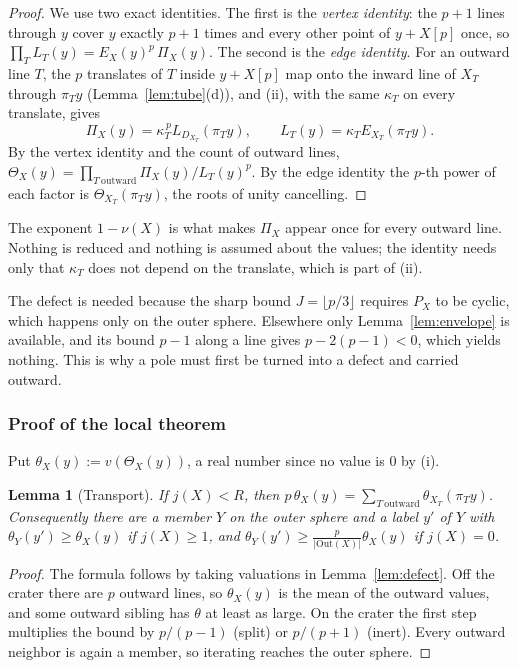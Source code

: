 \documentclass[11pt]{amsart}
\numberwithin{equation}{section}
\theoremstyle{plain}
\newtheorem{lemma}[theorem]{Lemma}
\theoremstyle{definition}
\theoremstyle{remark}
\begin{document}
\begin{proof}
We use two exact identities. The first is the \emph{vertex identity}: the \(p+1\) lines through \(y\) cover \(y\) exactly \(p+1\) times and every other point of \(y+X[p]\) once, so \(\prod_TL_T(y)=E_X(y)^p\,\Pi_X(y)\). The second is the \emph{edge identity}. For an outward line \(T\), the \(p\) translates of \(T\) inside \(y+X[p]\) map onto the inward line of \(X_T\) through \(\pi_Ty\) (Lemma~\ref{lem:tube}(d)), and (ii), with the same \(\kappa_T\) on every translate, gives
\[\Pi_X(y)=\kappa_T^{\,p}L_{D_{X_T}}(\pi_Ty),\qquad L_T(y)=\kappa_TE_{X_T}(\pi_Ty).\]
By the vertex identity and the count of outward lines, \(\Theta_X(y)=\prod_{T\ \text{outward}}\Pi_X(y)/L_T(y)^p\). By the edge identity the \(p\)-th power of each factor is \(\Theta_{X_T}(\pi_Ty)\), the roots of unity cancelling.
\end{proof}

The exponent \(1-\nu(X)\) is what makes \(\Pi_X\) appear once for every outward line. Nothing is reduced and nothing is assumed about the values; the identity needs only that \(\kappa_T\) does not depend on the translate, which is part of (ii).

The defect is needed because the sharp bound \(J=\lfloor p/3\rfloor\) requires \(P_X\) to be cyclic, which happens only on the outer sphere. Elsewhere only Lemma~\ref{lem:envelope} is available, and its bound \(p-1\) along a line gives \(p-2(p-1)<0\), which yields nothing. This is why a pole must first be turned into a defect and carried outward.

\subsubsection*{Proof of the local theorem}
Put \(\theta_X(y):=v(\Theta_X(y))\), a real number since no value is \(0\) by (i).

\begin{lemma}[Transport]\label{lem:transport}
If \(j(X)<R\), then \(p\,\theta_X(y)=\sum_{T\ \text{outward}}\theta_{X_T}(\pi_Ty)\). Consequently there are a member \(Y\) on the outer sphere and a label \(y'\) of \(Y\) with \(\theta_Y(y')\ge\theta_X(y)\) if \(j(X)\ge1\), and \(\theta_Y(y')\ge\tfrac{p}{|\mathrm{Out}(X)|}\theta_X(y)\) if \(j(X)=0\).
\end{lemma}

\begin{proof}
The formula follows by taking valuations in Lemma~\ref{lem:defect}. Off the crater there are \(p\) outward lines, so \(\theta_X(y)\) is the mean of the outward values, and some outward sibling has \(\theta\) at least as large. On the crater the first step multiplies the bound by \(p/(p-1)\) (split) or \(p/(p+1)\) (inert). Every outward neighbor is again a member, so iterating reaches the outer sphere.
\end{proof}
\end{document}
